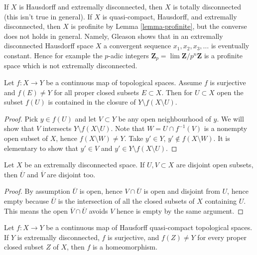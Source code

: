 \noindent
If $X$ is Hausdorff and extremally disconnected, then $X$ is totally
disconnected (this isn't true in general). If $X$ is quasi-compact,
Hausdorff, and extremally disconnected, then $X$ is profinite by
Lemma \ref{lemma-profinite}, but the converse does not holds in general.
Namely, Gleason shows that in an extremally disconnected Hausdorff space $X$
a convergent sequence $x_1, x_2, x_3, \ldots$ is eventually constant.
Hence for example the $p$-adic integers
$\mathbf{Z}_p = \lim \mathbf{Z}/p^n\mathbf{Z}$ is a profinite space
which is not extremally disconnected.

\begin{lemma}
\label{lemma-image-open-technical}
Let $f : X \to Y$ be a continuous map of topological spaces.
Assume $f$ is surjective and $f(E) \not = Y$ for all proper
closed subsets $E \subset X$. Then for $U \subset X$ open the subset
$f(U)$ is contained in the closure of $Y \setminus f(X \setminus U)$.
\end{lemma}

\begin{proof}
Pick $y \in f(U)$ and let $V \subset Y$ be any open neighbourhood of $y$.
We will show that $V$ intersects $Y \setminus f(X \setminus U)$.
Note that $W = U \cap f^{-1}(V)$ is a nonempty open subset of $X$, hence
$f(X \setminus W) \not = Y$. Take $y' \in Y$, $y' \not \in f(X \setminus W)$.
It is elementary to show that $y' \in V$ and
$y' \in Y \setminus f(X \setminus U)$.
\end{proof}

\begin{lemma}
\label{lemma-intersection-empty}
Let $X$ be an extremally disconnected space.
If $U, V \subset X$ are disjoint open subsets, then
$\overline{U}$ and $\overline{V}$ are disjoint too.
\end{lemma}

\begin{proof}
By assumption $\overline{U}$ is open, hence $V \cap \overline{U}$
is open and disjoint from $U$, hence empty because $\overline{U}$
is the intersection of all the closed subsets of $X$ containing $U$.
This means the open $\overline{V} \cap \overline{U}$ avoids $V$
hence is empty by the same argument.
\end{proof}

\begin{lemma}
\label{lemma-isomorphism}
Let $f : X \to Y$ be a continuous map of Hausforff quasi-compact
topological spaces. If $Y$ is extremally disconnected, $f$ is surjective,
and $f(Z) \not = Y$ for every proper closed subset $Z$ of $X$, then
$f$ is a homeomorphism.
\end{lemma}

